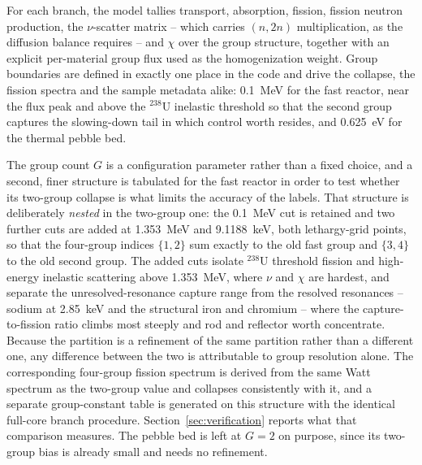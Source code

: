 \documentclass[preprint,12pt]{elsarticle}
\begin{document}
For each branch, the model tallies transport, absorption, fission, fission
neutron production, the $\nu$-scatter matrix -- which carries $(n,2n)$
multiplication, as the diffusion balance requires -- and $\chi$ over the group
structure, together with an explicit per-material group flux used as the
homogenization weight. Group boundaries are defined in exactly one place in the
code and drive the collapse, the fission spectra and the sample metadata alike:
0.1~MeV for the fast reactor, near the flux peak and above the $^{238}$U
inelastic threshold so that the second group captures the slowing-down tail in
which control worth resides, and 0.625~eV for the thermal pebble bed.

The group count $G$ is a configuration parameter rather than a fixed choice, and
a second, finer structure is tabulated for the fast reactor in order to test
whether its two-group collapse is what limits the accuracy of the labels. That
structure is deliberately \emph{nested} in the two-group one: the 0.1~MeV cut is
retained and two further cuts are added at 1.353~MeV and 9.1188~keV, both
lethargy-grid points, so that the four-group indices $\{1,2\}$ sum exactly to the
old fast group and $\{3,4\}$ to the old second group. The added cuts isolate
$^{238}$U threshold fission and high-energy inelastic scattering above
1.353~MeV, where $\nu$ and $\chi$ are hardest, and separate the
unresolved-resonance capture range from the resolved resonances -- sodium at
2.85~keV and the structural iron and chromium -- where the capture-to-fission
ratio climbs most steeply and rod and reflector worth concentrate. Because the
partition is a refinement of the same partition rather than a different one, any
difference between the two is attributable to group resolution alone. The
corresponding four-group fission spectrum is derived from the same Watt spectrum
as the two-group value and collapses consistently with it, and a separate
group-constant table is generated on this structure with the identical full-core
branch procedure. Section~\ref{sec:verification} reports what that comparison
measures. The pebble bed is left at $G=2$ on purpose, since its two-group bias is
already small and needs no refinement.
\end{document}
